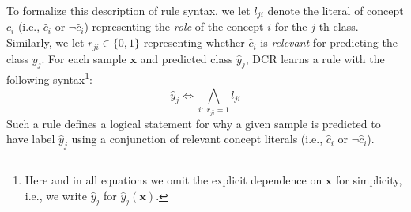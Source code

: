 To formalize this description of rule syntax, we let $l_{ji}$ denote the literal of concept $c_i$ (i.e., $\hat{c}_i$ or $\neg \hat{c}_i$) representing the \emph{role} of the concept $i$ for the $j$-th class. Similarly, we let $r_{ji} \in \{0,1\}$ representing whether $\hat{c}_i$ is \emph{relevant} for predicting the class $y_j$.
For each sample $\mathbf{x}$ and predicted class $\hat{y}_j$, DCR learns a rule with the following syntax\footnote{Here and in all equations we omit the explicit dependence on $\mathbf{x}$ for simplicity, i.e., we write $\hat{y}_j$ for $\hat{y}_j(\mathbf{x})$.}:
\begin{equation} \label{eq:target-rule}
    \hat{y}_j \Leftrightarrow \bigwedge_{i:\; r_{j i} = 1}{l_{ji}}
\end{equation}
Such a rule defines a logical statement for why a given sample is predicted to have label $\hat{y}_j$ using a conjunction of relevant concept literals (i.e., $\hat{c}_i$ or $\neg \hat{c}_i$).%





